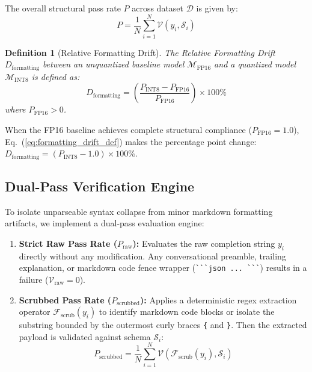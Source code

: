 \documentclass[10pt,journal,compsoc]{IEEEtran}
\newtheorem{definition}{Definition}
\begin{document}
The overall structural pass rate $P$ across dataset $\mathcal{D}$ is given by:
\begin{equation}
    P = \frac{1}{N} \sum_{i=1}^N \mathcal{V}(y_i, \mathcal{S}_i)
    \label{eq:pass_rate_definition}
\end{equation}

\begin{definition}[Relative Formatting Drift]
The Relative Formatting Drift $D_{\text{formatting}}$ between an unquantized baseline model $\mathcal{M}_{\text{FP16}}$ and a quantized model $\mathcal{M}_{\text{INT8}}$ is defined as:
\begin{equation}
    D_{\text{formatting}} = \left( \frac{P_{\text{INT8}} - P_{\text{FP16}}}{P_{\text{FP16}}} \right) \times 100\%
    \label{eq:formatting_drift_def}
\end{equation}
where $P_{\text{FP16}} > 0$.
\end{definition}

When the FP16 baseline achieves complete structural compliance ($P_{\text{FP16}} = 1.0$), Eq.~(\ref{eq:formatting_drift_def}) makes the percentage point change: $D_{\text{formatting}} = (P_{\text{INT8}} - 1.0) \times 100\%$.

\subsection{Dual-Pass Verification Engine}
To isolate unparseable syntax collapse from minor markdown formatting artifacts, we implement a dual-pass evaluation engine:

\begin{enumerate}
    \item \textbf{Strict Raw Pass Rate ($P_{\text{raw}}$):} Evaluates the raw completion string $y_i$ directly without any modification. Any conversational preamble, trailing explanation, or markdown code fence wrapper (\verb|```json ... ```|) results in a failure ($\mathcal{V}_{\text{raw}} = 0$).
    \item \textbf{Scrubbed Pass Rate ($P_{\text{scrubbed}}$):} Applies a deterministic regex extraction operator $\mathcal{F}_{\text{scrub}}(y_i)$ to identify markdown code blocks or isolate the substring bounded by the outermost curly braces \texttt{\{} and \texttt{\}}. Then the extracted payload is validated against schema $\mathcal{S}_i$:
    \begin{equation}
        P_{\text{scrubbed}} = \frac{1}{N} \sum_{i=1}^N \mathcal{V}(\mathcal{F}_{\text{scrub}}(y_i), \mathcal{S}_i)
    \end{equation}
\end{enumerate}
\end{document}

